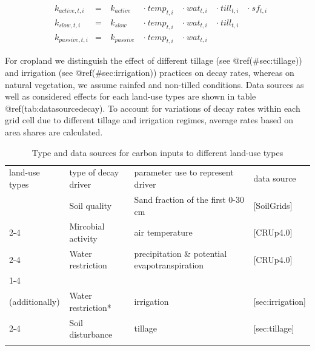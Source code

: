 \documentclass[gc, manuscript]{copernicus}
\begin{document}
\begin{equation}
\begin{aligned}
& k_{active,t,i}  & = &~ k_{active}  ~ &\cdot~ temp_{t,i} ~ &\cdot~ wat_{t,i} ~ &\cdot~ till_{t,i} ~ & \cdot~ sf_{t,i}\\
& k_{slow,t,i}    & = &~ k_{slow}    ~ &\cdot~ temp_{t,i} ~ &\cdot~ wat_{t,i} ~ &\cdot~ till_{t,i} ~ &\\
& k_{passive,t,i} & = &~ k_{passive} ~ &\cdot~ temp_{t,i} ~ &\cdot~ wat_{t,i} ~ & ~ &
\label{eq:decayrates}
\end{aligned}
\end{equation}

For cropland we distinguish the effect of different tillage (see
@ref(\#sec:tillage)) and irrigation (see @ref(\#sec:irrigation))
practices on decay rates, whereas on natural vegetation, we assume
rainfed and non-tilled conditions. Data sources as well as considered
effects for each land-use types are shown in table
@ref(tab:datasourcedecay). To account for variations of decay rates
within each grid cell due to different tillage and irrigation regimes,
average rates based on area shares are calculated.

 \begin{table}[h]
 \caption{Type and data sources for carbon inputs to different land-use types}
 \begin{tabular}{l l l l}
 \tophline
  land-use types   & type of decay driver & parameter use to represent driver & data source \\
 \middlehline
 \multirow{2}{*}{all} & Soil quality & Sand fraction of the first 0-30 cm &  [SoilGrids]  \\
                      \cline{2-4}
                      
                      & Mircobial activity & air temperature & [CRUp4.0] \\
                      \cline{2-4}
                      
                      & Water restriction & precipitation \& potential evapotranspiration & [CRUp4.0] \\
                      \cline{1-4}
\multirow{2}{*}{\begin{minipage}[t]{0.2\columnwidth}\raggedright\strut Cropland\\(additionally)\strut\end{minipage}} & Water restriction*  & irrigation  & [sec:irrigation] \\ 
                      \cline{2-4}
                      
                      & Soil disturbance & tillage & [sec:tillage] \\
 \bottomhline
 \end{tabular}
 \label{tab:datasourcedecay}
 \belowtable{}
 \end{table}
\end{document}
